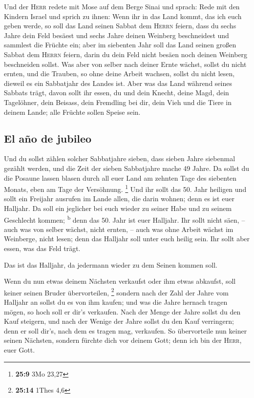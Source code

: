  Und der \textsc{Herr} redete mit Mose auf dem Berge Sinai
und sprach:  Rede mit den Kindern Israel und sprich zu
ihnen: Wenn ihr in das Land kommt, das ich euch geben werde, so soll das
Land seinen Sabbat dem \textsc{Herrn} feiern,  dass du
sechs Jahre dein Feld besäest und sechs Jahre deinen Weinberg
beschneidest und sammlest die Früchte ein;  aber im
siebenten Jahr soll das Land seinen großen Sabbat dem \textsc{Herrn}
feiern, darin du dein Feld nicht besäen noch deinen Weinberg beschneiden
sollst.  Was aber von selber nach deiner Ernte wächst,
sollst du nicht ernten, und die Trauben, so ohne deine Arbeit wachsen,
sollst du nicht lesen, dieweil es ein Sabbatjahr des Landes ist.
 Aber was das Land während seines Sabbats trägt, davon
sollt ihr essen, du und dein Knecht, deine Magd, dein Tagelöhner, dein
Beisass, dein Fremdling bei dir,  dein Vieh und die Tiere
in deinem Lande; alle Früchte sollen Speise sein.

\hypertarget{el-auxf1o-de-jubileo}{%
\subsection{El año de jubileo}\label{el-auxf1o-de-jubileo}}

 Und du sollst zählen solcher Sabbatjahre sieben, dass
sieben Jahre siebenmal gezählt werden, und die Zeit der sieben
Sabbatjahre mache 49 Jahre.  Da sollst du die Posaune
lassen blasen durch all euer Land am zehnten Tage des siebenten Monats,
eben am Tage der Versöhnung. \footnote{\textbf{25:9} 3Mo 23,27}
 Und ihr sollt das 50. Jahr heiligen und sollt ein
Freijahr ausrufen im Lande allen, die darin wohnen; denn es ist euer
Halljahr. Da soll ein jeglicher bei euch wieder zu seiner Habe und zu
seinem Geschlecht kommen; \textsuperscript{b}  denn das
50. Jahr ist euer Halljahr. Ihr sollt nicht säen, -- auch was von selber
wächst, nicht ernten, -- auch was ohne Arbeit wächst im Weinberge, nicht
lesen;  denn das Halljahr soll unter euch heilig sein.
Ihr sollt aber essen, was das Feld trägt.

 Das ist das Halljahr, da jedermann wieder zu dem Seinen
kommen soll.

 Wenn du nun etwas deinem Nächsten verkaufst oder ihm
etwas abkaufst, soll keiner seinen Bruder übervorteilen, \footnote{\textbf{25:14}
  1Thes 4,6}  sondern nach der Zahl der Jahre vom
Halljahr an sollst du es von ihm kaufen; und was die Jahre hernach
tragen mögen, so hoch soll er dir's verkaufen.  Nach der
Menge der Jahre sollst du den Kauf steigern, und nach der Wenige der
Jahre sollst du den Kauf verringern; denn er soll dir's, nach dem es
tragen mag, verkaufen.  So übervorteile nun keiner seinen
Nächsten, sondern fürchte dich vor deinem Gott; denn ich bin der
\textsc{Herr}, euer Gott.

